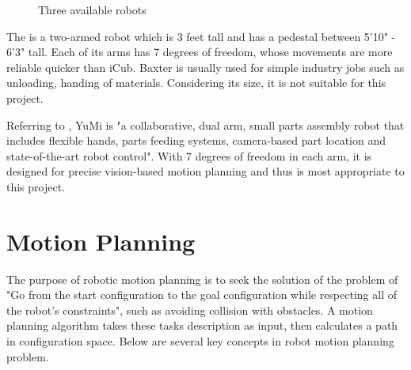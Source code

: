 \begin{figure}[H]
\centering
{}
\caption{Three available robots}
\label{robot}
\end{figure}

The \citep{baxter} is a two-armed robot which is 3 feet tall and has a pedestal between 5'10" - 6'3" tall. Each of its arms has 7 degrees of freedom, whose movements are more reliable quicker than iCub. Baxter is usually used for simple industry jobs such as unloading, handing of materials. Considering its size, it is not suitable for this project. 

Referring to \citep{ABBsDual5:online}, YuMi is "a collaborative, dual arm, small parts assembly robot that includes flexible hands, parts feeding systems, camera-based part location and state-of-the-art robot control". With 7 degrees of freedom in each arm, it is designed for precise vision-based motion planning and thus is most appropriate to this project.

\section{Motion Planning}
The purpose of robotic motion planning is to seek the solution of the problem of "Go from the start configuration to the goal configuration while respecting all of the robot's constraints", such as avoiding collision with obstacles. A motion planning algorithm takes these tasks description as input, then calculates a path in configuration space. Below are several key concepts in robot motion planning problem.

